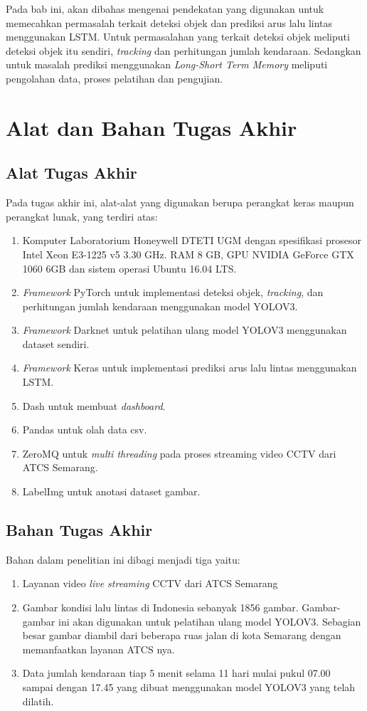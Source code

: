 \documentclass[../thesis.tex]{subfiles}
\begin{document}
Pada bab ini, akan dibahas mengenai pendekatan yang digunakan untuk memecahkan permasalah terkait deteksi objek dan prediksi arus lalu lintas menggunakan LSTM. Untuk permasalahan yang terkait deteksi objek meliputi deteksi objek itu sendiri, \textit{tracking} dan perhitungan jumlah kendaraan. Sedangkan
untuk masalah prediksi menggunakan \textit{Long-Short Term Memory} meliputi pengolahan data, proses pelatihan dan pengujian.

\section{Alat dan Bahan Tugas Akhir}
\subsection{Alat Tugas Akhir}
Pada tugas akhir ini, alat-alat yang digunakan berupa perangkat keras maupun perangkat
lunak, yang terdiri atas:
\begin{enumerate}
	\item Komputer Laboratorium Honeywell DTETI UGM dengan spesifikasi prosesor Intel Xeon E3-1225 v5 3.30 GHz. RAM 8 GB, GPU NVIDIA GeForce GTX 1060 6GB dan sistem operasi Ubuntu 16.04 LTS.
	\item \textit{Framework} PyTorch untuk implementasi deteksi objek, \textit{tracking}, dan perhitungan jumlah kendaraan menggunakan model YOLOV3.
	\item \textit{Framework} Darknet \cite{darknet13} untuk pelatihan ulang model YOLOV3 menggunakan dataset sendiri.
	\item \textit{Framework} Keras untuk implementasi prediksi arus lalu lintas menggunakan LSTM.
	\item Dash untuk membuat \textit{dashboard}.
	\item Pandas untuk olah data csv.
	\item ZeroMQ untuk \textit{multi threading} pada proses streaming video CCTV dari ATCS Semarang.
	\item LabelImg untuk anotasi dataset gambar.
\end{enumerate}

\subsection{Bahan Tugas Akhir}
Bahan dalam penelitian ini dibagi menjadi tiga yaitu:
\begin{enumerate}
	\item Layanan video \textit{live streaming} CCTV dari ATCS Semarang 
	\item Gambar kondisi lalu lintas di Indonesia sebanyak 1856 gambar. Gambar-gambar ini akan digunakan untuk pelatihan ulang model YOLOV3. Sebagian besar gambar diambil dari beberapa ruas jalan di kota Semarang dengan memanfaatkan layanan ATCS nya.
	\item Data jumlah kendaraan tiap 5 menit selama 11 hari mulai pukul 07.00 sampai dengan 17.45 yang dibuat menggunakan model YOLOV3 yang telah dilatih.
\end{enumerate}	
\end{document}
